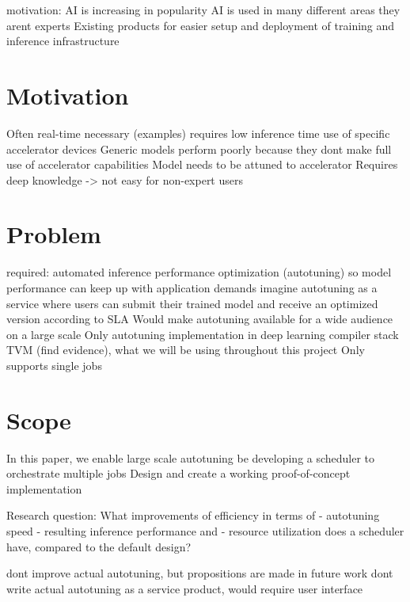 motivation:
AI is increasing in popularity
AI is used in many different areas
they arent experts
Existing products for easier setup and deployment of training and inference infrastructure

\section{Motivation}
Often real-time necessary (examples)
requires low inference time
use of specific accelerator devices
Generic models perform poorly because they dont make full use of accelerator capabilities
Model needs to be attuned to accelerator
Requires deep knowledge -> not easy for non-expert users

\section{Problem}
required: automated inference performance optimization (autotuning) so model performance can keep up with application demands
imagine autotuning as a service where users can submit their trained model and receive an optimized version according to SLA
Would make autotuning available for a wide audience on a large scale
Only autotuning implementation in deep learning compiler stack TVM (find evidence), what we will be using throughout this project
Only supports single jobs

\section{Scope}
In this paper, we enable large scale autotuning be developing a scheduler to orchestrate multiple jobs
Design and create a working proof-of-concept implementation

Research question:
What improvements of efficiency in terms of
- autotuning speed
- resulting inference performance and 
- resource utilization
does a scheduler have, compared to the default design?

dont improve actual autotuning, but propositions are made in future work
dont write actual autotuning as a service product, would require user interface